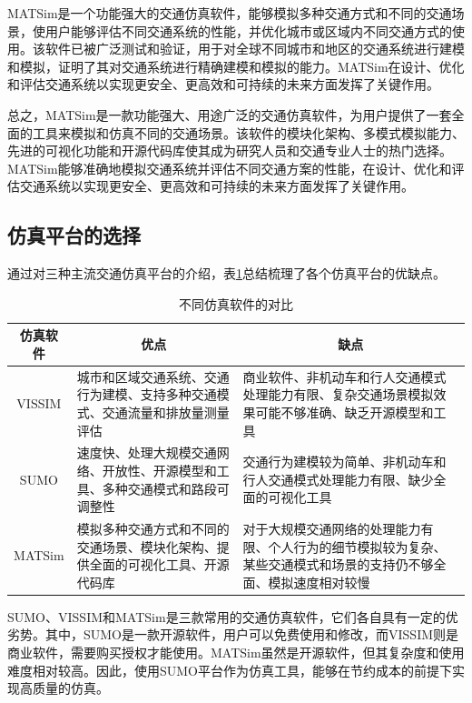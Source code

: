 MATSim是一个功能强大的交通仿真软件，能够模拟多种交通方式和不同的交通场景，使用户能够评估不同交通系统的性能，并优化城市或区域内不同交通方式的使用。该软件已被广泛测试和验证，用于对全球不同城市和地区的交通系统进行建模和模拟，证明了其对交通系统进行精确建模和模拟的能力。MATSim在设计、优化和评估交通系统以实现更安全、更高效和可持续的未来方面发挥了关键作用。

总之，MATSim是一款功能强大、用途广泛的交通仿真软件，为用户提供了一套全面的工具来模拟和仿真不同的交通场景。该软件的模块化架构、多模式模拟能力、先进的可视化功能和开源代码库使其成为研究人员和交通专业人士的热门选择。MATSim能够准确地模拟交通系统并评估不同交通方案的性能，在设计、优化和评估交通系统以实现更安全、更高效和可持续的未来方面发挥了关键作用。


\subsection{仿真平台的选择}

通过对三种主流交通仿真平台的介绍，表\ref{tab:3_1}总结梳理了各个仿真平台的优缺点。

\renewcommand{\arraystretch}{1.5} %
\begin{table}[htbp]
\centering
\caption{不同仿真软件的对比}
\label{tab:3_1}
\begin{tabular}{cll}
\toprule
仿真软件 & \multicolumn{1}{c}{优点}       & \multicolumn{1}{c}{缺点}     \\
\midrule
VISSIM                       & \parbox[t]{5.5cm}{城市和区域交通系统、交通行为建模、支持多种交通模式、交通流量和排放量测量评估}      & \parbox[t]{5.5cm}{商业软件、非机动车和行人交通模式处理能力有限、复杂交通场景模拟效果可能不够准确、缺乏开源模型和工具 }                       \\
SUMO                      & \parbox[t]{5.5cm}{速度快、处理大规模交通网络、开放性、开源模型和工具、多种交通模式和路段可调整性}    & \parbox[t]{5.5cm}{交通行为建模较为简单、非机动车和行人交通模式处理能力有限、缺少全面的可视化工具}              \\ 
MATSim                    & \parbox[t]{5.5cm}{模拟多种交通方式和不同的交通场景、模块化架构、提供全面的可视化工具、开源代码库}   & \parbox[t]{5.5cm}{对于大规模交通网络的处理能力有限、个人行为的细节模拟较为复杂、某些交通模式和场景的支持仍不够全面、模拟速度相对较慢}              \\
\bottomrule
\end{tabular}
\end{table}


SUMO、VISSIM和MATSim是三款常用的交通仿真软件，它们各自具有一定的优劣势。其中，SUMO是一款开源软件，用户可以免费使用和修改，而VISSIM则是商业软件，需要购买授权才能使用。MATSim虽然是开源软件，但其复杂度和使用难度相对较高。因此，使用SUMO平台作为仿真工具，能够在节约成本的前提下实现高质量的仿真。

